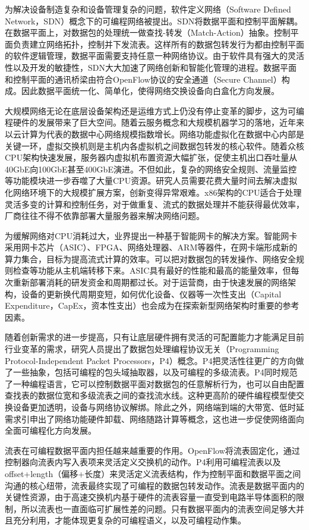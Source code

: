 为解决设备制造复杂和设备管理复杂的问题，软件定义网络（Software Defined Network，SDN）概念下的可编程网络被提出。SDN将数据平面和控制平面解耦。在数据平面上，对数据包的处理统一做查找-转发（Match-Action）抽象。控制平面负责建立网络拓扑，控制并下发流表。这样所有的数据包转发行为都由控制平面的软件逻辑管理，数据平面需要支持任意一种网络协议。由于软件具有强大的灵活性以及开发的敏捷性，SDN大大加速了网络创新和智能化管理的进程。数据平面和控制平面的通讯桥梁由符合OpenFlow协议的安全通道（Secure Channel）构成。因此数据平面统一化、简单化，使得网络交换设备向白盒化方向发展。	

大规模网络无论在底层设备架构还是运维方式上仍没有停止变革的脚步，这为可编程硬件的发展带来了巨大空间。随着云服务概念和大规模机器学习的落地，近年来以云计算为代表的数据中心网络规模指数增长。网络功能虚拟化在数据中心内部是关键一环，虚拟交换机则是主机内各虚拟机之间数据包转发的核心软件。随着众核CPU架构快速发展，服务器内虚拟机布置资源大幅扩张，促使主机出口吞吐量从40GbE向100GbE甚至400GbE演进。不但如此，复杂的网络安全规则、流量监控等功能模块进一步吞噬了大量CPU资源。研究人员需要花费大量时间去解决虚拟化网络环境下的大规模扩展方案，创新变得异常艰难。x86架构的CPU适合于处理灵活多变的计算和控制任务，对于做重复、流式的数据处理并不能获得最优效率，厂商往往不得不依靠部署大量服务器来解决网络问题。

为缓解网络对CPU消耗过大，业界提出一种基于智能网卡的解决方案。智能网卡采用网卡芯片（ASIC）、FPGA、网络处理器、ARM等器件，在网卡端形成新的算力集合，目标为提高流式计算的效率。可以把对数据包的转发操作、网络安全规则检查等功能从主机端转移下来。ASIC具有最好的性能和最高的能量效率，但每次重新部署消耗的研发资金和周期都过长。对于运营商，由于快速发展的网络架构，设备的更新换代周期变短，如何优化设备、仪器等一次性支出（Capital Expenditure，CapEx，资本性支出）也会成为在探索新型网络架构时重要的参考因素。

随着创新需求的进一步提高，只有让底层硬件拥有灵活的可配置能力才能满足目前行业变革的需求，研究人员提出了数据包处理编程协议无关（Programming Protocol-Independent Packet Processors，P4）概念。P4把灵活性往更广的方向做了一些抽象，包括可编程的包头域抽取器，以及可编程的多级流表。P4同时规范了一种编程语言，它可以控制数据平面对数据包的任意解析行为，也可以自由配置查找表的数据位宽和多级流表之间的查找流水线。这种更高阶的硬件编程模型使交换设备更加透明，设备与网络协议解绑。除此之外，网络端到端的大带宽、低时延需求引申出了网络功能硬件卸载、网络随路计算等概念，这也进一步促使网络面向全面可编程化方向发展。

流表在可编程数据平面内担任越来越重要的作用。OpenFlow将流表固定化，通过控制器向流表内写入表项来灵活定义交换机的动作。P4利用可编程流表以及offset+length（偏移+长度）来灵活定义流表结构，作为控制平面和数据平面之间沟通的核心纽带，流表最终实现了可编程的数据包转发动作。流表是数据平面内的关键性资源，由于高速交换机内基于硬件的流表容量一直受到电路半导体面积的限制，所以流表也一直面临可扩展性差的问题。只有数据平面内的流表空间足够大并且充分利用，才能体现更复杂的可编程语义，以及可编程动作集。

